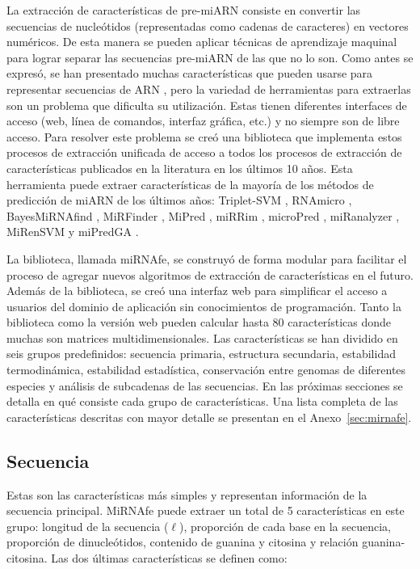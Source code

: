 La extracción de características de pre-miARN consiste en convertir las secuencias de nucleótidos (representadas como cadenas de caracteres) en vectores
numéricos. De esta manera se pueden aplicar técnicas de aprendizaje maquinal para lograr separar las secuencias pre-miARN de las que no lo son. Como antes se
expresó, se han presentado muchas características que pueden usarse para representar secuencias de ARN \citep{Lopes2014}, pero la variedad de herramientas para
extraerlas son un problema que dificulta su utilización. Estas tienen diferentes interfaces de acceso (web, línea de comandos, interfaz gráfica, etc.) y no
siempre son de libre acceso. Para resolver este problema se creó una biblioteca que implementa estos procesos de extracción unificada de acceso a todos los
procesos de extracción de características publicados en la literatura en los últimos 10 años. Esta herramienta puede extraer características de la mayoría de
los métodos de predicción de miARN de los últimos años: Triplet-SVM \citep{xue2005classification}, RNAmicro \citep{hertel2006hairpins}, BayesMiRNAfind
\citep{yousef2006combining}, MiRFinder \citep{huang2007mirfinder}, MiPred \citep{jiang2007mipred}, miRRim \citep{terai2007mirrim}, microPred
\citep{batuwita2009micropred}, miRanalyzer \citep{hackenberg2009miranalyzer}, MiRenSVM \citep{ding2010mirensvm} y miPredGA \citep{xuan2011genetic}.

La biblioteca, llamada miRNAfe, se construyó de forma modular para facilitar el proceso de agregar nuevos algoritmos de extracción de características en el
futuro. Además de la biblioteca, se creó una interfaz web para simplificar el acceso a usuarios del dominio de aplicación sin conocimientos de programación.
Tanto la biblioteca como la versión web pueden calcular hasta 80 características donde muchas son matrices multidimensionales. Las características se han
dividido en seis grupos predefinidos: secuencia primaria, estructura secundaria, estabilidad termodinámica, estabilidad estadística, conservación entre genomas
de diferentes especies y análisis de subcadenas de las secuencias. En las próximas secciones se detalla en qué consiste cada grupo de características. Una lista
completa de las características descritas con mayor detalle se presentan en el Anexo~\ref{sec:mirnafe}.


\subsection{Secuencia}

Estas son las características más simples y representan información de la secuencia principal. MiRNAfe puede extraer un total de 5 características en este
grupo: longitud de la secuencia ($\ell$), proporción de cada base en la secuencia, proporción de dinucleótidos, contenido de guanina y citosina y relación
guanina-citosina. Las dos últimas características se definen como:

